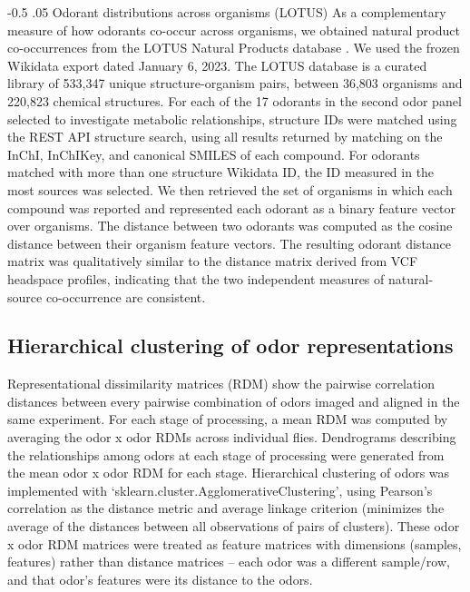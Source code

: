 \documentclass[12pt]{caltech_thesis}
\makeatletter
\renewcommand{\cite}{{ }\autocite}
\let\Oldsubsection\subsection
\renewcommand{\subsection}{\FloatBarrier\Oldsubsection}
\let\Oldsubsubsection\subsubsection
\renewcommand{\subsubsection}{\FloatBarrier\Oldsubsubsection}
\renewcommand\subsubsection{%
    \@startsection{subsubsection}{4}{0mm}%
       {-0.5\baselineskip}%
       {.05\baselineskip}%
       {\normalfont\normalsize\bfseries\itshape}}
\makeatother
\begin{document}
\begin{refsection}
\subsubsection{Odorant distributions across organisms (LOTUS)}
As a complementary measure of how odorants co-occur across organisms, we obtained  natural product co-occurrences from the LOTUS Natural Products database\cite{LOTUS}.
We used the frozen Wikidata export dated January 6, 2023. %
The LOTUS database is a curated library of 533,347 unique structure-organism pairs, between 36,803 organisms and 220,823 chemical structures.
For each of the 17 odorants in the second odor panel selected to investigate metabolic relationships, structure IDs were matched using the REST API structure search, using all results returned by matching on the InChI, InChIKey, and canonical SMILES of each compound.
For odorants matched with more than one structure Wikidata ID, the ID measured in the most sources was selected.
We then retrieved the set of organisms in which each compound was reported and represented each odorant as a binary feature vector over organisms.
The distance between two odorants was computed as the cosine distance between their organism feature vectors.
The resulting odorant distance matrix was qualitatively similar to the distance matrix derived from VCF headspace profiles, indicating that the two independent measures of natural-source co-occurrence are consistent.

\subsection{Hierarchical clustering of odor representations}
Representational dissimilarity matrices (RDM) show the pairwise correlation distances between every pairwise combination of odors imaged and aligned in the same experiment.
For each stage of processing, a mean RDM was computed by averaging the odor x odor RDMs across individual flies.
Dendrograms describing the relationships among odors at each stage of processing were generated from the mean odor x odor RDM for each stage.
Hierarchical clustering of odors was implemented with `sklearn.cluster.AgglomerativeClustering', using Pearson's correlation as the distance metric and average linkage criterion (minimizes the average of the distances between all observations of pairs of clusters).
These odor x odor RDM matrices were treated as feature matrices with dimensions (samples, features) rather than distance matrices – each odor was a different sample/row, and that odor's features were its distance to the odors.


\end{refsection}
\end{document}
